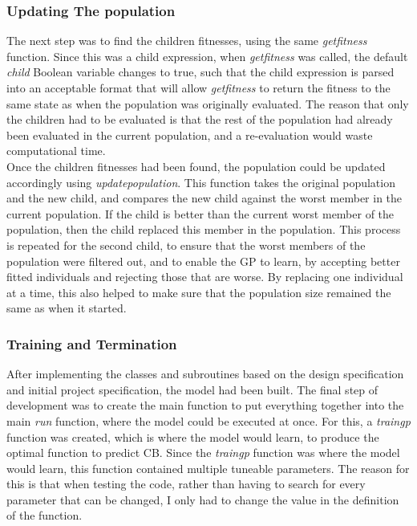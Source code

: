 \documentclass[11pt]{article}
\begin{document}
\subsubsection{Updating The population}\label{subsubsec:UP}
The next step was to find the children fitnesses, using the same \textit{get\textunderscore fitness} function. Since this was a child expression, when \textit{get\textunderscore fitness} was called, the default \textit{child} Boolean variable changes to true, such that the child expression is parsed into an acceptable format that will allow \textit{get\textunderscore fitness} to return the fitness to the same state as when the population was originally evaluated. The reason that only the children had to be evaluated is that the rest of the population had already been evaluated in the current population, and a re-evaluation would waste computational time.  \\

Once the children fitnesses had been found, the population could be updated accordingly using \textit{update\textunderscore population}. This function takes the original population and the new child, and compares the new child against the worst member in the current population. If the child is better than the current worst member of the population, then the child replaced this member in the population. This process is repeated for the second child, to ensure that the worst members of the population were filtered out, and to enable the GP to learn, by accepting better fitted individuals and rejecting those that are worse. By replacing one individual at a time, this also helped to make sure that the population size remained the same as when it started. 
\subsubsection{Training and Termination}\label{subsubsec:TR}
After implementing the classes and subroutines based on the design specification and initial project specification, the model had been built. The final step of development was to create the main function to put everything together into the main \textit{run} function, where the model could be executed at once. For this, a \textit{train\textunderscore gp} function was created, which is where the model would learn, to produce the optimal function to predict CB. Since the \textit{train\textunderscore gp} function was where the model would learn, this function contained multiple tuneable parameters. The reason for this is that when testing the code, rather than having to search for every parameter that can be changed, I only had to change the value in the definition of the function.
\end{document}
